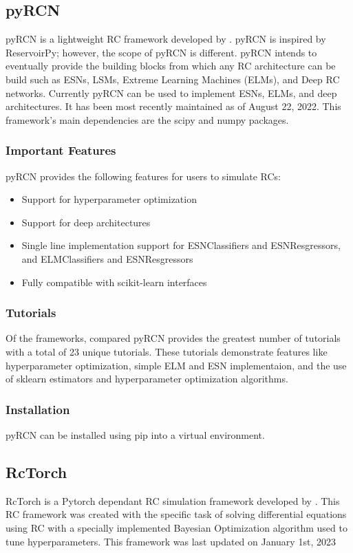 \documentclass[a4paper,fleqn]{cas-dc}
\begin{document}
\subsection{pyRCN}
 pyRCN is a lightweight RC framework developed by \cite{steiner2021pyrcn}. pyRCN is inspired by ReservoirPy; however, the scope of pyRCN is different. pyRCN intends to eventually provide the building blocks from which any RC architecture can be build such as ESNs, LSMs, Extreme Learning Machines (ELMs), and Deep RC networks. Currently pyRCN can be used to implement ESNs, ELMs, and deep architectures. It has been most recently maintained as of August 22, 2022. This framework's main dependencies are the scipy and numpy packages.
 
\subsubsection{Important Features}

pyRCN provides the following features for users to simulate RCs:
\begin{itemize}
    \item Support for hyperparameter optimization
    \item Support for deep architectures
    \item Single line implementation support for ESNClassifiers and ESNResgressors, and ELMClassifiers and ESNResgressors
    \item Fully compatible with scikit-learn interfaces
\end{itemize}

\subsubsection{Tutorials}
Of the frameworks, compared pyRCN provides the greatest number of tutorials with a total of 23 unique tutorials. These tutorials demonstrate features like hyperparameter optimization, simple ELM and ESN implementaion, and the use of sklearn estimators and hyperparameter optimization algorithms.

\subsubsection{Installation}
pyRCN can be installed using pip into a virtual environment. 


\subsection{RcTorch}
RcTorch is a Pytorch dependant RC simulation framework developed by \cite{joy2022rctorch}. This RC framework was created with the specific task of solving differential equations using RC with a specially implemented Bayesian Optimization algorithm used to tune hyperparameters. This framework was last updated on January 1st, 2023
 
\end{document}
